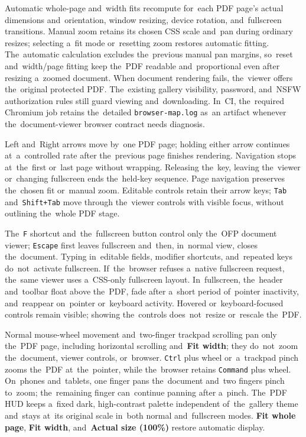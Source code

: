 \documentclass[11pt,a4paper]{article}
\newcommand{\ui}[1]{\textbf{#1}}
\newcommand{\codeword}[1]{\nolinkurl{#1}}
\begin{document}
Automatic whole-page and~width fits recompute for~each PDF page's actual
dimensions and~orientation, window resizing, device rotation, and~fullscreen
transitions. Manual zoom retains its chosen CSS scale and~pan during ordinary
resizes; selecting a~fit mode or~resetting zoom restores automatic fitting.
The~automatic calculation excludes the~previous manual pan margins, so~reset
and~width/page fitting keep the~PDF readable and~proportional even after
resizing a~zoomed document. When document rendering fails, the~viewer offers
the~original protected PDF. The~existing gallery visibility, password, and~NSFW
authorization rules still guard viewing and~downloading. In~CI, the~required
Chromium job retains the~detailed \codeword{browser-map.log} as~an artifact
whenever the~document-viewer browser contract needs diagnosis.

Left and~Right arrows move by~one PDF page; holding either arrow continues
at~a~controlled rate after the~previous page finishes rendering. Navigation
stops at~the~first or~last page without wrapping. Releasing the~key, leaving
the~viewer or~changing fullscreen ends the~held-key sequence. Page navigation
preserves the~chosen fit or~manual zoom. Editable controls retain their arrow
keys; \codeword{Tab} and~\codeword{Shift+Tab} move through the~viewer controls
with visible focus, without outlining the~whole PDF stage.

The~\codeword{F} shortcut and~the~fullscreen button control only the~OFP
document viewer; \codeword{Escape} first leaves fullscreen and~then, in~normal
view, closes the~document. Typing in~editable fields, modifier shortcuts,
and~repeated keys do~not~activate fullscreen. If~the~browser refuses a~native
fullscreen request, the~same viewer uses a~CSS-only fullscreen layout.
In~fullscreen, the~header and~toolbar float above the~PDF, fade after a~short
period of~pointer inactivity, and~reappear on~pointer or~keyboard activity.
Hovered or~keyboard-focused controls remain visible; showing the~controls
does~not~resize or~rescale the~PDF.

Normal mouse-wheel movement and~two-finger trackpad scrolling pan only the~PDF
page, including horizontal scrolling and~\ui{Fit width}; they do~not~zoom
the~document, viewer controls, or~browser. \codeword{Ctrl} plus wheel
or~a~trackpad pinch zooms the~PDF at~the~pointer, while the~browser retains
\codeword{Command} plus wheel. On~phones and~tablets, one finger pans
the~document and~two fingers pinch to~zoom; the~remaining finger can~continue
panning after a~pinch. The~PDF HUD keeps a~fixed dark, high-contrast palette
independent of~the~gallery theme and~stays at~its original scale in~both normal
and~fullscreen modes. \ui{Fit whole page}, \ui{Fit width}, and~\ui{Actual size
(100\%)} restore automatic display.
\end{document}
